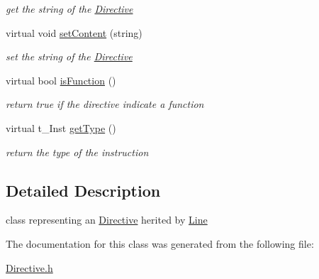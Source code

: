 \begin{DoxyCompactItemize}
\begin{DoxyCompactList}\small\item\em get the string of the \hyperlink{classDirective}{Directive} \item\end{DoxyCompactList}\item 
\hypertarget{classDirective_a015ce52f1282454208ebc613260a5c67}{
virtual void \hyperlink{classDirective_a015ce52f1282454208ebc613260a5c67}{setContent} (string)}
\label{classDirective_a015ce52f1282454208ebc613260a5c67}

\begin{DoxyCompactList}\small\item\em set the string of the \hyperlink{classDirective}{Directive} \item\end{DoxyCompactList}\item 
\hypertarget{classDirective_a5141831f1ebbe73fb15085790d1decfa}{
virtual bool \hyperlink{classDirective_a5141831f1ebbe73fb15085790d1decfa}{isFunction} ()}
\label{classDirective_a5141831f1ebbe73fb15085790d1decfa}

\begin{DoxyCompactList}\small\item\em return true if the directive indicate a function \item\end{DoxyCompactList}\item 
\hypertarget{classDirective_a97289e08e5fbfe822a15fd70fb1b48f3}{
virtual t\_\-Inst \hyperlink{classDirective_a97289e08e5fbfe822a15fd70fb1b48f3}{getType} ()}
\label{classDirective_a97289e08e5fbfe822a15fd70fb1b48f3}

\begin{DoxyCompactList}\small\item\em return the type of the instruction \item\end{DoxyCompactList}\end{DoxyCompactItemize}


\subsection{Detailed Description}
class representing an \hyperlink{classDirective}{Directive} herited by \hyperlink{classLine}{Line} 

The documentation for this class was generated from the following file:\begin{DoxyCompactItemize}
\item 
\hyperlink{Directive_8h}{Directive.h}\end{DoxyCompactItemize}

